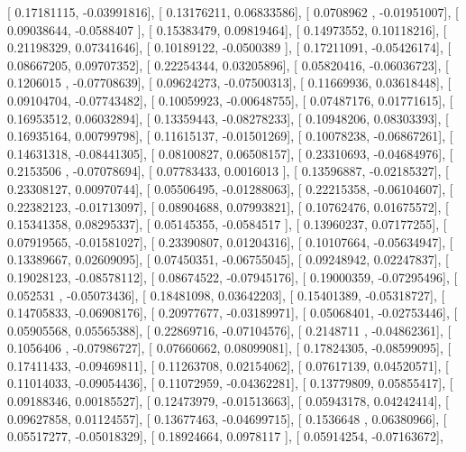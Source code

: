 \documentclass{article}
\begin{document}
       [ 0.17181115, -0.03991816],
       [ 0.13176211,  0.06833586],
       [ 0.0708962 , -0.01951007],
       [ 0.09038644, -0.0588407 ],
       [ 0.15383479,  0.09819464],
       [ 0.14973552,  0.10118216],
       [ 0.21198329,  0.07341646],
       [ 0.10189122, -0.0500389 ],
       [ 0.17211091, -0.05426174],
       [ 0.08667205,  0.09707352],
       [ 0.22254344,  0.03205896],
       [ 0.05820416, -0.06036723],
       [ 0.1206015 , -0.07708639],
       [ 0.09624273, -0.07500313],
       [ 0.11669936,  0.03618448],
       [ 0.09104704, -0.07743482],
       [ 0.10059923, -0.00648755],
       [ 0.07487176,  0.01771615],
       [ 0.16953512,  0.06032894],
       [ 0.13359443, -0.08278233],
       [ 0.10948206,  0.08303393],
       [ 0.16935164,  0.00799798],
       [ 0.11615137, -0.01501269],
       [ 0.10078238, -0.06867261],
       [ 0.14631318, -0.08441305],
       [ 0.08100827,  0.06508157],
       [ 0.23310693, -0.04684976],
       [ 0.2153506 , -0.07078694],
       [ 0.07783433,  0.0016013 ],
       [ 0.13596887, -0.02185327],
       [ 0.23308127,  0.00970744],
       [ 0.05506495, -0.01288063],
       [ 0.22215358, -0.06104607],
       [ 0.22382123, -0.01713097],
       [ 0.08904688,  0.07993821],
       [ 0.10762476,  0.01675572],
       [ 0.15341358,  0.08295337],
       [ 0.05145355, -0.0584517 ],
       [ 0.13960237,  0.07177255],
       [ 0.07919565, -0.01581027],
       [ 0.23390807,  0.01204316],
       [ 0.10107664, -0.05634947],
       [ 0.13389667,  0.02609095],
       [ 0.07450351, -0.06755045],
       [ 0.09248942,  0.02247837],
       [ 0.19028123, -0.08578112],
       [ 0.08674522, -0.07945176],
       [ 0.19000359, -0.07295496],
       [ 0.052531  , -0.05073436],
       [ 0.18481098,  0.03642203],
       [ 0.15401389, -0.05318727],
       [ 0.14705833, -0.06908176],
       [ 0.20977677, -0.03189971],
       [ 0.05068401, -0.02753446],
       [ 0.05905568,  0.05565388],
       [ 0.22869716, -0.07104576],
       [ 0.2148711 , -0.04862361],
       [ 0.1056406 , -0.07986727],
       [ 0.07660662,  0.08099081],
       [ 0.17824305, -0.08599095],
       [ 0.17411433, -0.09469811],
       [ 0.11263708,  0.02154062],
       [ 0.07617139,  0.04520571],
       [ 0.11014033, -0.09054436],
       [ 0.11072959, -0.04362281],
       [ 0.13779809,  0.05855417],
       [ 0.09188346,  0.00185527],
       [ 0.12473979, -0.01513663],
       [ 0.05943178,  0.04242414],
       [ 0.09627858,  0.01124557],
       [ 0.13677463, -0.04699715],
       [ 0.1536648 ,  0.06380966],
       [ 0.05517277, -0.05018329],
       [ 0.18924664,  0.0978117 ],
       [ 0.05914254, -0.07163672],
\end{document}
